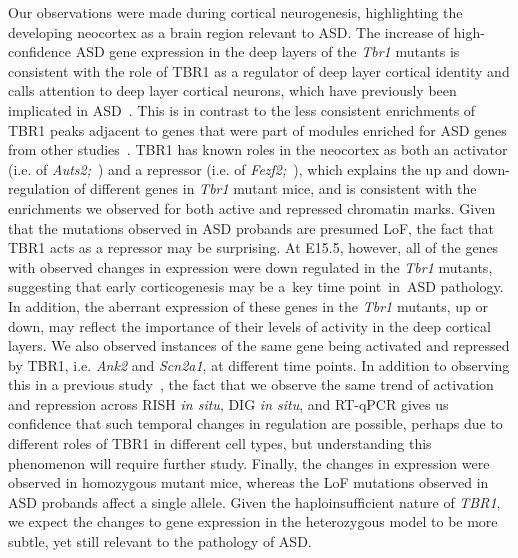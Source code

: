 Our observations were made during cortical neurogenesis, highlighting
the developing neocortex as a brain region relevant to ASD. The increase
of high-confidence ASD gene expression in the deep layers of the
\emph{Tbr1} mutants is consistent with the role of TBR1 as a regulator
of deep layer cortical identity and calls attention to deep layer
cortical neurons, which have previously been implicated in ASD~\citep{Willsey:2013bd}. This is in contrast to the less consistent enrichments of
TBR1 peaks adjacent to genes that were part of modules enriched for ASD
genes from other studies~\citep{Parikshak:2013di, Li:2014ft, Hormozdiari:2015ih}. TBR1 has known roles in the neocortex as both
an activator (i.e. of \emph{Auts2;}~\citep{Bedogni:2010ew}) and a repressor
(i.e. of \emph{Fezf2;}~\citep{Han:2011fs, McKenna:2011ew}), which
explains the up and down-regulation of different genes in \emph{Tbr1}
mutant mice, and is consistent with the enrichments we observed for both
active and repressed chromatin marks. Given that the mutations observed
in ASD probands are presumed LoF, the fact that TBR1 acts as a repressor
may be surprising. At E15.5, however, all of the genes with observed
changes in expression were down regulated in the \emph{Tbr1} mutants,
suggesting that early corticogenesis may be a~key time point~in~ASD
pathology. In addition, the aberrant expression of these genes in the
\emph{Tbr1} mutants, up or down, may reflect the importance of their
levels of activity in the deep cortical layers. We also observed
instances of the same gene being activated and repressed by TBR1, i.e.
\emph{Ank2} and \emph{Scn2a1}, at different time points. In addition to
observing this in a previous study~\citep{McKenna:2015fv}, the fact that
we observe the same trend of activation and repression across RISH
\emph{in situ}, DIG \emph{in situ}, and RT-qPCR gives us confidence that
such temporal changes in regulation are possible, perhaps due to
different roles of TBR1 in different cell types, but understanding this
phenomenon will require further study. Finally, the changes in
expression were observed in homozygous mutant mice, whereas the LoF
mutations observed in ASD probands affect a single allele. Given the
haploinsufficient nature of \emph{TBR1}, we expect the changes to gene
expression in the heterozygous model to be more subtle, yet still
relevant to the pathology of ASD.


